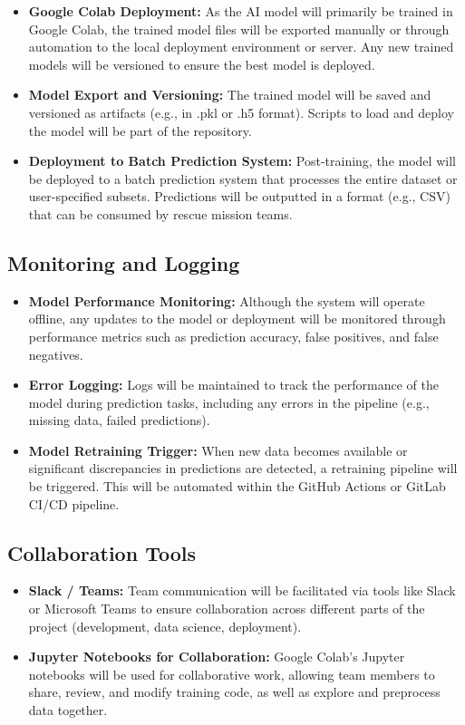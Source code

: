 \documentclass[15pt]{article}
\begin{document}
\begin{itemize}
    \item \textbf{Google Colab Deployment:} As the AI model will primarily be trained in Google Colab, the trained model files will be exported manually or through automation to the local deployment environment or server. Any new trained models will be versioned to ensure the best model is deployed.
    \item \textbf{Model Export and Versioning:} The trained model will be saved and versioned as artifacts (e.g., in .pkl or .h5 format). Scripts to load and deploy the model will be part of the repository.
    \item \textbf{Deployment to Batch Prediction System:} Post-training, the model will be deployed to a batch prediction system that processes the entire dataset or user-specified subsets. Predictions will be outputted in a format (e.g., CSV) that can be consumed by rescue mission teams.
\end{itemize}

\subsection{Monitoring and Logging}

\begin{itemize}
    \item \textbf{Model Performance Monitoring:} Although the system will operate offline, any updates to the model or deployment will be monitored through performance metrics such as prediction accuracy, false positives, and false negatives.
    \item \textbf{Error Logging:} Logs will be maintained to track the performance of the model during prediction tasks, including any errors in the pipeline (e.g., missing data, failed predictions).
    \item \textbf{Model Retraining Trigger:} When new data becomes available or significant discrepancies in predictions are detected, a retraining pipeline will be triggered. This will be automated within the GitHub Actions or GitLab CI/CD pipeline.
\end{itemize}

\subsection{Collaboration Tools}

\begin{itemize}
    \item \textbf{Slack / Teams:} Team communication will be facilitated via tools like Slack or Microsoft Teams to ensure collaboration across different parts of the project (development, data science, deployment).
    \item \textbf{Jupyter Notebooks for Collaboration:} Google Colab’s Jupyter notebooks will be used for collaborative work, allowing team members to share, review, and modify training code, as well as explore and preprocess data together.
\end{itemize}
\end{document}
